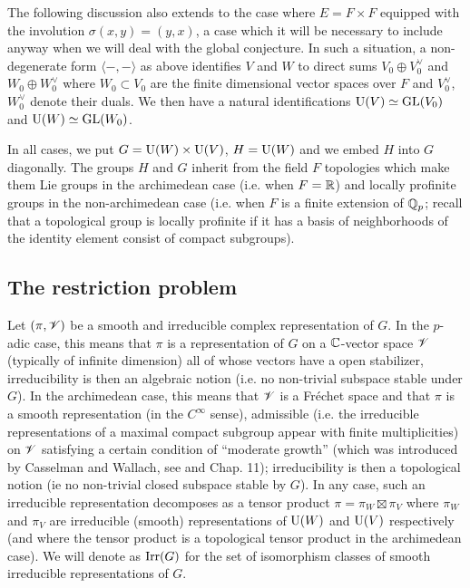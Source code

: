 The following discussion also extends to the case where $E = F \times F$ equipped with the involution $\sigma(x, y) = (y, x)$, a case which it will be necessary to include anyway when we will deal with the global conjecture.
In such a situation, a non-degenerate form $\langle -, -\rangle$ as above identifies $V$ and $W$ to direct sums $V_0 \oplus V_0^\vee$ and $W_0 \oplus W_0^\vee$ where $W_0 \subset V_0$ are the finite dimensional vector spaces over $F$ and $V_0^\vee$, $W_0^\vee$ denote their duals.
We then have a natural identifications $\mathrm{U}(V) \simeq \mathrm{GL}(V_0)$ and $\mathrm{U}(W) \simeq \mathrm{GL}(W_0)$.

In all cases, we put $G = \mathrm{U}(W) \times \mathrm{U}(V)$, $H = \mathrm{U}(W)$ and we embed $H$ into $G$ diagonally.
The groups $H$ and $G$ inherit from the field $F$ topologies which make them Lie groups in the archimedean case (i.e. when $F = \mathbb{R}$) and locally profinite groups in the non-archimedean case (i.e. when $F$ is a finite extension of $\mathbb{Q}_p$; recall that a topological group is locally profinite if it has a basis of neighborhoods of the identity element consist of compact subgroups).


\subsection{The restriction problem}

Let $(\pi, \mathscr{V})$ be a smooth and irreducible complex representation of $G$.
In the $p$-adic case, this means that $\pi$ is a representation of $G$ on a $\mathbb{C}$-vector space $\mathscr{V}$ (typically of infinite dimension) all of whose vectors have a open stabilizer, irreducibility is then
an algebraic notion (i.e. no non-trivial subspace stable under $G$).
In the archimedean case, this means that $\mathscr{V}$ is a Fréchet space and that $\pi$ is a smooth representation (in the $C^\infty$ sense), admissible (i.e. the irreducible representations of a maximal compact subgroup appear with finite multiplicities) on $\mathscr{V}$ satisfying a certain condition of “moderate growth” (which was introduced by Casselman and Wallach, see \cite{casselman1989canonical} and \cite{wallachreal} Chap. 11); irreducibility is then a topological notion (ie no non-trivial closed subspace stable by $G$).
In any case, such an irreducible representation decomposes as a tensor product $\pi = \pi_W \boxtimes \pi_V$ where $\pi_W$ and $\pi_V$ are irreducible (smooth) representations of $\mathrm{U}(W)$ and $\mathrm{U}(V)$ respectively (and where the tensor product is a topological tensor product in the archimedean case).
We will denote as $\mathrm{Irr}(G)$ for the set of isomorphism classes of smooth irreducible representations of $G$.

